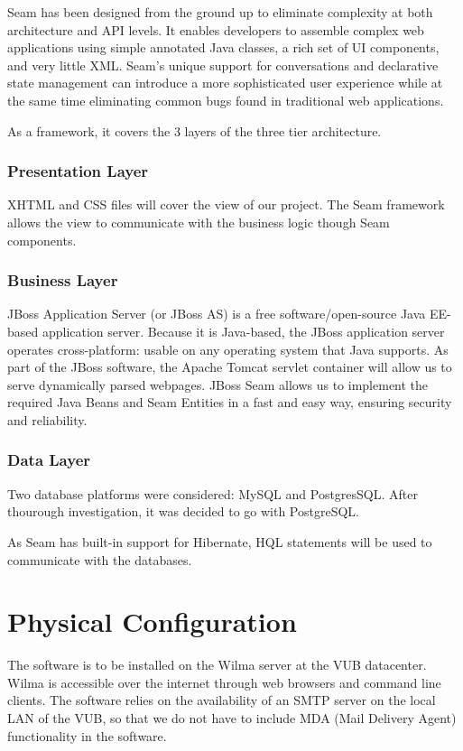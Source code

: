 \documentclass[salesmen, twoside]{../../../templates/latex/2009/softproj}
\begin{document}
\begin{projdoc}
Seam has been designed from the ground up to eliminate complexity at both architecture and API levels. It enables developers to assemble complex web applications using simple annotated Java classes, a rich set of UI components, and very little XML. Seam's unique support for conversations and declarative state management can introduce a more sophisticated user experience while at the same time eliminating common bugs found in traditional web applications.

As a framework, it covers the 3 layers of the three tier architecture.

\subsubsection{Presentation Layer}
XHTML and CSS files will cover the view of our project. The Seam framework allows the view to communicate with the business logic though Seam components.

\subsubsection{Business Layer}
JBoss Application Server (or JBoss AS) is a free software/open-source Java EE-based application server. Because it is Java-based, the JBoss application server operates cross-platform: usable on any operating system that Java supports. 
As part of the JBoss software, the Apache Tomcat servlet container will allow us to serve dynamically parsed webpages.
JBoss Seam allows us to implement the required Java Beans and Seam Entities in a fast and easy way, ensuring security and reliability.

\subsubsection{Data Layer}
Two database platforms were considered: MySQL and PostgresSQL.
After thourough investigation, it was decided to go with PostgreSQL.

As Seam has built-in support for Hibernate, HQL statements will be used to communicate with the databases. 


\section{Physical Configuration}
The software is to be installed on the Wilma server at the VUB datacenter. Wilma is accessible over the internet through web browsers and command line clients. The software relies on the availability of an SMTP server on the local LAN of the VUB, so that we do not have to include MDA (Mail Delivery Agent) functionality in the software.


\end{projdoc}
\end{document}
